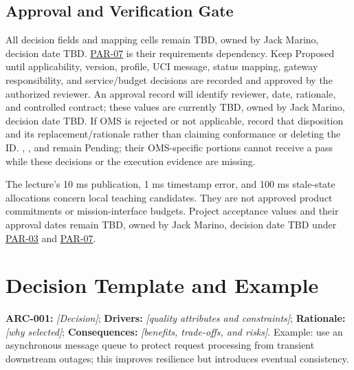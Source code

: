 \subsection{Approval and Verification Gate}
All decision fields and mapping cells remain TBD, owned by Jack Marino,
decision date TBD. \hyperref[Parameter:PAR-07]{PAR-07} is their requirements
dependency. Keep  Proposed until applicability,
version, profile, UCI message, status mapping, gateway responsibility, and
service/budget decisions are recorded and approved by the authorized reviewer.
An approval record will identify reviewer, date, rationale, and controlled
contract; these values are currently TBD, owned by Jack Marino, decision date
TBD. If OMS is rejected or not applicable, record that disposition and its
replacement/rationale rather than claiming conformance or deleting the ID.
, , and
 remain Pending; their OMS-specific portions cannot
receive a pass while these decisions or the execution evidence are missing.

The lecture's 10 ms publication, 1 ms timestamp error, and 100 ms stale-state
allocations concern local teaching candidates. They are not approved product
commitments or mission-interface budgets. Project acceptance values and their
approval dates remain TBD, owned by Jack Marino, decision date TBD under
\hyperref[Parameter:PAR-03]{PAR-03} and
\hyperref[Parameter:PAR-07]{PAR-07}.

\section{Decision Template and Example}
\textbf{ARC-001:} \textit{[Decision]}; \textbf{Drivers:} \textit{[quality attributes and constraints]}; \textbf{Rationale:} \textit{[why selected]}; \textbf{Consequences:} \textit{[benefits, trade-offs, and risks]}. Example: use an asynchronous message queue to protect request processing from transient downstream outages; this improves resilience but introduces eventual consistency.
